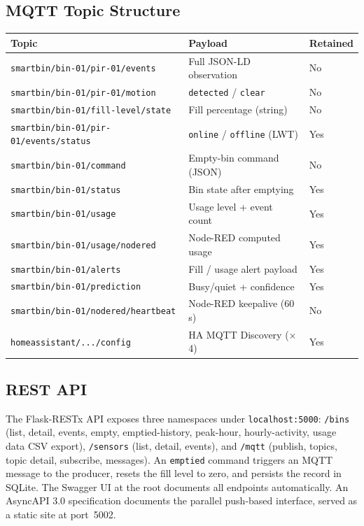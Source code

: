 \documentclass[10pt,a4paper]{article}
\begin{document}
\subsection{MQTT Topic Structure}

\begin{center}
\begin{tabularx}{\linewidth}{@{}lXl@{}}
\toprule
\textbf{Topic} & \textbf{Payload} & \textbf{Retained} \\
\midrule
\texttt{smartbin/bin-01/pir-01/events} & Full JSON-LD observation & No \\
\texttt{smartbin/bin-01/pir-01/motion} & \texttt{detected} / \texttt{clear} & No \\
\texttt{smartbin/bin-01/fill-level/state} & Fill percentage (string) & No \\
\texttt{smartbin/bin-01/pir-01/events/status}& \texttt{online} / \texttt{offline} (LWT) & Yes \\
\texttt{smartbin/bin-01/command} & Empty-bin command (JSON) & No \\
\texttt{smartbin/bin-01/status} & Bin state after emptying & Yes \\
\texttt{smartbin/bin-01/usage} & Usage level + event count & Yes \\
\texttt{smartbin/bin-01/usage/nodered} & Node-RED computed usage & Yes \\
\texttt{smartbin/bin-01/alerts} & Fill / usage alert payload & Yes \\
\texttt{smartbin/bin-01/prediction} & Busy/quiet + confidence & Yes \\
\texttt{smartbin/bin-01/nodered/heartbeat} & Node-RED keepalive (60\,s) & No \\
\texttt{homeassistant/.../config} & HA MQTT Discovery ($\times$4) & Yes \\
\bottomrule
\end{tabularx}
\end{center}

\subsection{REST API}

The Flask-RESTx API exposes three namespaces under \texttt{localhost:5000}:
\texttt{/bins} (list, detail, events, empty, emptied-history, peak-hour, hourly-activity, usage data CSV export),
\texttt{/sensors} (list, detail, events), and
\texttt{/mqtt} (publish, topics, topic detail, subscribe, messages).
An \texttt{emptied} command triggers an MQTT message to the producer, resets the
fill level to zero, and persists the record in SQLite. The Swagger UI at the root
documents all endpoints automatically. An AsyncAPI 3.0 specification documents the
parallel push-based interface, served as a static site at port~5002.
\end{document}
